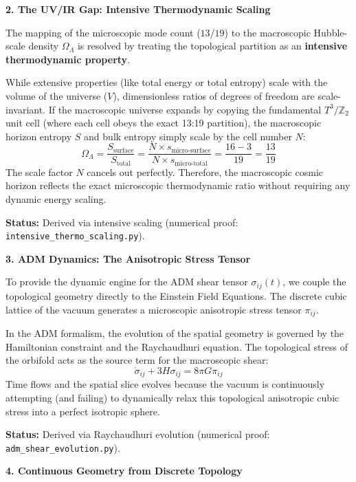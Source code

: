 \documentclass[12pt,a4paper]{article}
\newcommand{\Ztwo}{\mathbb{Z}_2}
\newcommand{\Tthree}{T^3}
\newcommand{\OmegaL}{\Omega_\Lambda}
\begin{document}
\textbf{2. The UV/IR Gap: Intensive Thermodynamic Scaling}

The mapping of the microscopic mode count ($13/19$) to the macroscopic Hubble-scale density $\OmegaL$ is resolved by treating the topological partition as an \textbf{intensive thermodynamic property}.

While extensive properties (like total energy or total entropy) scale with the volume of the universe ($V$), dimensionless ratios of degrees of freedom are scale-invariant. If the macroscopic universe expands by copying the fundamental $\Tthree/\Ztwo$ unit cell (where each cell obeys the exact 13:19 partition), the macroscopic horizon entropy $S$ and bulk entropy simply scale by the cell number $N$:
\begin{equation}
\OmegaL = \frac{S_{\text{surface}}}{S_{\text{total}}} = \frac{N \times s_{\text{micro-surface}}}{N \times s_{\text{micro-total}}} = \frac{16 - 3}{19} = \frac{13}{19}
\end{equation}
The scale factor $N$ cancels out perfectly. Therefore, the macroscopic cosmic horizon reflects the exact microscopic thermodynamic ratio without requiring any dynamic energy scaling.

\textbf{Status:} Derived via intensive scaling (numerical proof: \texttt{intensive\_thermo\_scaling.py}).

\textbf{3. ADM Dynamics: The Anisotropic Stress Tensor}

To provide the dynamic engine for the ADM shear tensor $\sigma_{ij}(t)$, we couple the topological geometry directly to the Einstein Field Equations. The discrete cubic lattice of the vacuum generates a microscopic anisotropic stress tensor $\pi_{ij}$.

In the ADM formalism, the evolution of the spatial geometry is governed by the Hamiltonian constraint and the Raychaudhuri equation. The topological stress of the orbifold acts as the source term for the macroscopic shear:
\begin{equation}
\dot{\sigma}_{ij} + 3H\sigma_{ij} = 8\pi G \pi_{ij}
\end{equation}
Time flows and the spatial slice evolves because the vacuum is continuously attempting (and failing) to dynamically relax this topological anisotropic cubic stress into a perfect isotropic sphere.

\textbf{Status:} Derived via Raychaudhuri evolution (numerical proof: \texttt{adm\_shear\_evolution.py}).

\textbf{4. Continuous Geometry from Discrete Topology}
\end{document}
